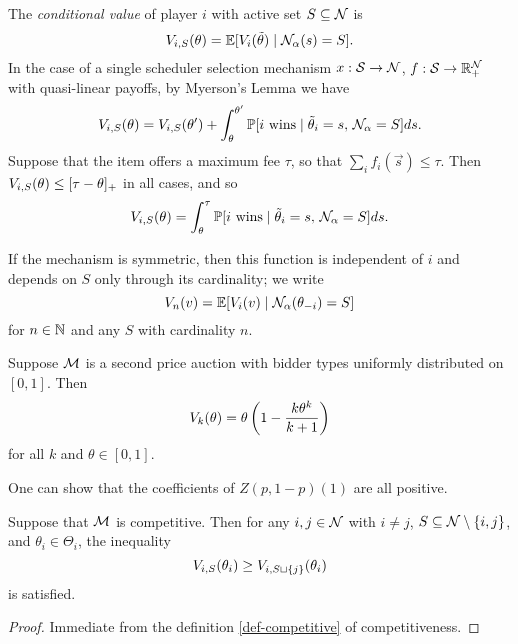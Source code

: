\begin{definition}

  The \emph{conditional value} of player $i$ with active set $S\subseteq \mathcal{N}$ is
  \[
    V_{i,S}(\theta) = \mathbb{E}[V_i(\tilde{\theta}) \mid \mathcal{N}_\alpha(s)=S].
  \]
  In the case of a single scheduler selection mechanism $x:\mathcal{S}\rightarrow\mathcal{N}$, $f:\mathcal{S}\rightarrow\mathbb{R}_+^{\mathcal{N}}$ with quasi-linear payoffs, by Myerson's Lemma we have
  \[
    V_{i,S}(\theta) = V_{i,S}(\theta') + \int_{\theta}^{\theta'} \mathbb{P}[i \text{ wins} \mid \tilde{\theta}_i = s,\,\mathcal{N}_\alpha = S] ds.
  \]
  Suppose that the item offers a maximum fee $\tau$, so that $\sum_if_i(\vec{s}) \leq\tau$.
  Then $V_{i,S}(\theta) \leq [\tau - \theta]_+$ in all cases, and so
  \[
    V_{i,S}(\theta) = \int_{\theta}^\tau \mathbb{P}[i \text{ wins} \mid \tilde{\theta}_i = s,\,\mathcal{N}_\alpha = S] ds.
  \]


  If the mechanism is symmetric, then this function is independent of $i$ and depends on $S$ only through its cardinality; we write
  \[
    V_{n}(v) = \mathbb{E}[V_i(v) \mid \mathcal{N}_\alpha(\theta_{-i})=S]
  \]
  for $n\in\mathbb{N}$ and any $S$ with cardinality $n$.
  
\end{definition}


\begin{example}

  Suppose $\mathcal{M}$ is a second price auction with bidder types uniformly distributed on $[0,1]$.
  Then 
  \[
    V_k(\theta) = \theta \left( 1 - \frac{k\theta^k}{k+1} \right)
  \]
  for all $k$ and $\theta\in[0,1]$.
  
  One can show that the coefficients of $Z(p,1-p)(1)$ are all positive.

\end{example}

\begin{lemma}
  \label{conditional-value-monotonic}

  Suppose that $\mathcal{M}$ is competitive.
  Then for any $i,j\in\mathcal{N}$ with $i\neq j$, $S\subseteq\mathcal{N}\setminus\{i,j\}$, and $\theta_i\in\Theta_i$, the inequality
  \[
    V_{i,S}(\theta_i) \geq V_{i,S\sqcup\{j\}}(\theta_i)
  \]
  is satisfied.

\end{lemma}
%
\begin{proof}

  Immediate from the definition \ref{def-competitive} of competitiveness. \qedhere

\end{proof}


